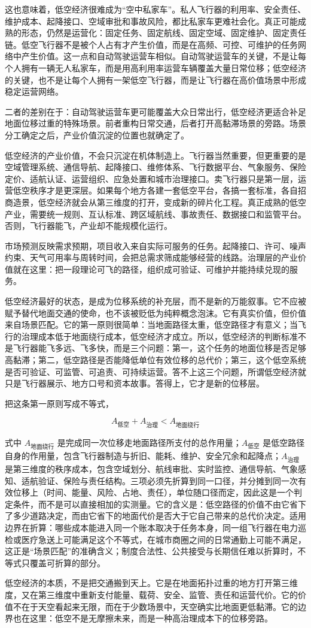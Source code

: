 这也意味着，低空经济很难成为“空中私家车”。私人飞行器的利用率、安全责任、维护成本、起降接口、空域审批和事故风险，都比私家车更难社会化。真正可能成熟的形态，仍然是运营化：固定任务、固定航线、固定空域、固定维护、固定责任链。低空飞行器不是被个人占有才产生价值，而是在高频、可控、可维护的任务网络中产生价值。这一点和自动驾驶运营车相似。自动驾驶运营车的关键，不是让每个人拥有一辆无人私家车，而是用高利用率运营车辆覆盖大量日常位移；低空经济的关键，也不是让每个人拥有一架低空飞行器，而是让飞行器在高价值场景中形成稳定运营网络。

二者的差别在于：自动驾驶运营车更可能覆盖大众日常出行，低空经济更适合补足地面位移过重的特殊场景。前者重构日常交通，后者打开高黏滞场景的旁路。场景分工确定之后，产业价值沉淀的位置也就确定了。


低空经济的产业价值，不会只沉淀在机体制造上。飞行器当然重要，但更重要的是空域管理系统、通信导航、起降接口、维修体系、飞行数据平台、气象服务、保险定价、适航认证、运营组织、应急处置和城市治理接口。卖飞行器只是第一层，运营低空秩序才是更深层。如果每个地方各建一套低空平台，各搞一套标准，各自招商造景，低空经济就会从第三维度的打开，变成新的碎片化工程。真正成熟的低空产业，需要统一规则、互认标准、跨区域航线、事故责任、数据接口和监管平台。否则，飞行器能飞，产业却不能规模化运行。

市场预测反映需求预期，项目收入来自实际可服务的任务。起降接口、许可、噪声约束、天气可用率与周转时间，会把总需求筛成能够经营的线路。治理层的产业价值就在这里：把一段理论可飞的路径，组织成可验证、可维护并能持续兑现的服务。

低空经济最好的状态，是成为位移系统的补充层，而不是新的万能叙事。它不应被赋予替代地面交通的使命，也不该被贬低为纯粹概念泡沫。它有真实价值，但价值来自场景匹配。它的第一原则很简单：当地面路径太重，低空路径才有意义；当飞行的治理成本低于地面绕行成本，低空经济才成立。所以，低空经济的判断标准不是飞行器能飞多远、飞多快，而是三个问题：第一，这个任务的地面位移是否足够高黏滞；第二，低空路径是否能降低单位有效位移的总代价；第三，这个低空系统是否可验证、可监管、可追责、可持续运营。答不上这三个问题，所谓低空经济就只是飞行器展示、地方口号和资本故事。答得上，它才是新的位移层。

把这条第一原则写成不等式，

\begin{equation}
A_{\text{低空}}+A_{\text{治理}}<A_{\text{地面绕行}}
\end{equation}

式中 $A_{\text{地面绕行}}$ 是完成同一次位移走地面路径所支付的总作用量；$A_{\text{低空}}$ 是低空路径自身的作用量，包含飞行器制造与折旧、能耗、维护、安全冗余和起降点；$A_{\text{治理}}$ 是第三维度的秩序成本，包含空域划分、航线审批、实时监控、通信导航、气象感知、适航验证、保险与责任结构。三项必须先折算到同一口径，并分摊到同一次有效位移上（时间、能量、风险、占地、责任），单位随口径而定，因此这是一个判定条件，而不是可以直接相加的实测量。它的含义是：低空路径的价值不由它省下了多少道路决定，而由它省下的地面代价是否大于它自己带来的总代价决定。适用边界在折算：哪些成本能进入同一个账本取决于任务本身，同一组飞行器在电力巡检或医疗急送上可能满足这个不等式，在城市商圈之间的日常通勤上可能不满足，这正是“场景匹配”的准确含义；制度合法性、公共接受与长期信任难以折算时，不等式只覆盖可折算的部分。

低空经济的本质，不是把交通搬到天上。它是在地面拓扑过重的地方打开第三维度，又在第三维度中重新支付能量、载荷、安全、监管、责任和运营代价。它的价值不在于天空看起来无限，而在于少数场景中，天空确实比地面更低黏滞。它的边界也在这里：低空不是无摩擦未来，而是一种高治理成本下的位移旁路。
